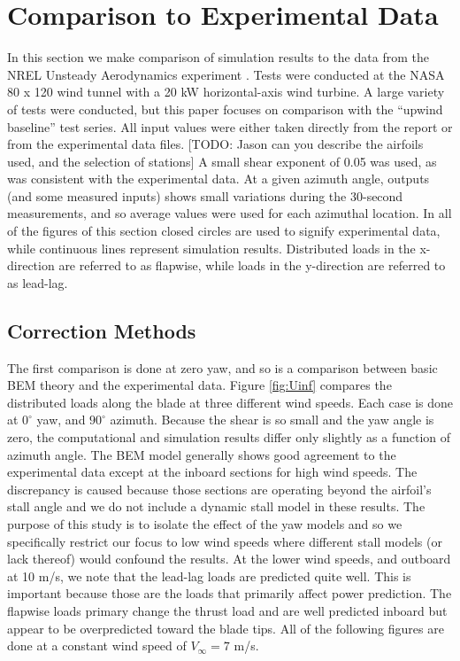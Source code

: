 \documentclass[]{aiaa-tc}%
\begin{document}
\section{Comparison to Experimental Data}
In this section we make comparison of simulation results to the data from the NREL Unsteady Aerodynamics experiment \cite{Hand:2001}.  Tests were conducted at the NASA 80 x 120 wind tunnel with a 20 kW horizontal-axis wind turbine.  A large variety of tests were conducted, but this paper focuses on comparison with the ``upwind baseline'' test series. All input values were either taken directly from the report or from the experimental data files. [TODO: Jason can you describe the airfoils used, and the selection of stations]  A small shear exponent of 0.05 was used, as was consistent with the experimental data.  At a given azimuth angle, outputs (and some measured inputs) shows small variations during the 30-second measurements, and so average values were used for each azimuthal location.  In all of the figures of this section closed circles are used to signify experimental data, while continuous lines represent simulation results.  Distributed loads in the x-direction are referred to as flapwise, while loads in the y-direction are referred to as lead-lag.  

\subsection{Correction Methods}

The first comparison is done at zero yaw, and so is a comparison between basic BEM theory and the experimental data.  Figure \ref{fig:Uinf} compares the distributed loads along the blade at three different wind speeds.  Each case is done at $0^\circ$ yaw, and $90^\circ$ azimuth.  Because the shear is so small and the yaw angle is zero, the computational and simulation results differ only slightly as a function of azimuth angle.  The BEM model generally shows good agreement to the experimental data except at the inboard sections for high wind speeds.  The discrepancy is caused because those sections are operating beyond the airfoil's stall angle and we do not include a dynamic stall model in these results. The purpose of this study is to isolate the effect of the yaw models and so we specifically restrict our focus to low wind speeds where different stall models (or lack thereof) would confound the results.  At the lower wind speeds, and outboard at 10 m/s, we note that the lead-lag loads are predicted quite well.  This is important because those are the loads that primarily affect power prediction.  The flapwise loads primary change the thrust load and are well predicted inboard but appear to be overpredicted toward the blade tips.  All of the following figures are done at a constant wind speed of $V_\infty = 7$ m/s.
\end{document}
